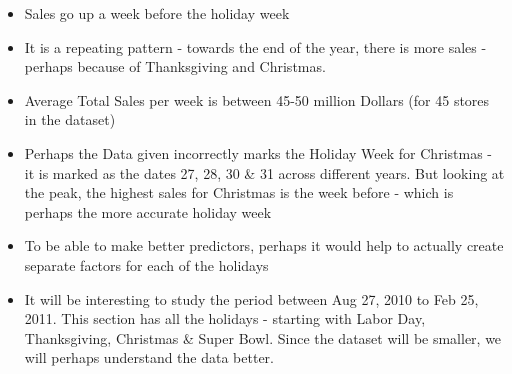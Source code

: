 \documentclass[]{article}
\begin{document}
\begin{itemize}
\itemsep1pt\parskip0pt
\item
  Sales go up a week before the holiday week
\item
  It is a repeating pattern - towards the end of the year, there is more
  sales - perhaps because of Thanksgiving and Christmas.
\item
  Average Total Sales per week is between 45-50 million Dollars (for 45
  stores in the dataset)
\item
  Perhaps the Data given incorrectly marks the Holiday Week for
  Christmas - it is marked as the dates 27, 28, 30 \& 31 across
  different years. But looking at the peak, the highest sales for
  Christmas is the week before - which is perhaps the more accurate
  holiday week
\item
  To be able to make better predictors, perhaps it would help to
  actually create separate factors for each of the holidays
\item
  It will be interesting to study the period between Aug 27, 2010 to Feb
  25, 2011. This section has all the holidays - starting with Labor Day,
  Thanksgiving, Christmas \& Super Bowl. Since the dataset will be
  smaller, we will perhaps understand the data better.
\end{itemize}
\end{document}

